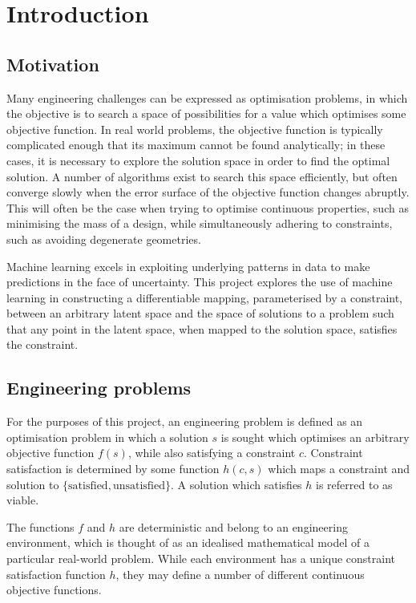 \documentclass[../../main.tex]{subfiles}
\begin{document}
\chapter{Introduction} \label{chapter:introduction}

\section{Motivation} \label{section:motivation}

Many engineering challenges can be expressed as optimisation problems, in which the objective is to search a space of possibilities for a value which optimises some objective function.
In real world problems, the objective function is typically complicated enough that its maximum cannot be found analytically; in these cases, it is necessary to explore the solution space in order to find the optimal solution.
A number of algorithms exist to search this space efficiently, but often converge slowly when the error surface of the objective function changes abruptly.
This will often be the case when trying to optimise continuous properties, such as minimising the mass of a design, while simultaneously adhering to constraints, such as avoiding degenerate geometries.

Machine learning excels in exploiting underlying patterns in data to make predictions in the face of uncertainty.
This project explores the use of machine learning in constructing a differentiable mapping, parameterised by a constraint, between an arbitrary latent space and the space of solutions to a problem such that any point in the latent space, when mapped to the solution space, satisfies the constraint.

\section{Engineering problems} \label{section:engineeringProblems}

For the purposes of this project, an engineering problem is defined as an optimisation problem in which a solution $s$ is sought which optimises an arbitrary objective function $f(s)$, while also satisfying a constraint $c$.
Constraint satisfaction is determined by some function $h(c,s)$ which maps a constraint and solution to $\{\text{satisfied},\text{unsatisfied}\}$.
A solution which satisfies $h$ is referred to as viable.

The functions $f$ and $h$ are deterministic and belong to an engineering environment, which is thought of as an idealised mathematical model of a particular real-world problem.
While each environment has a unique constraint satisfaction function $h$, they may define a number of different continuous objective functions.
\end{document}
